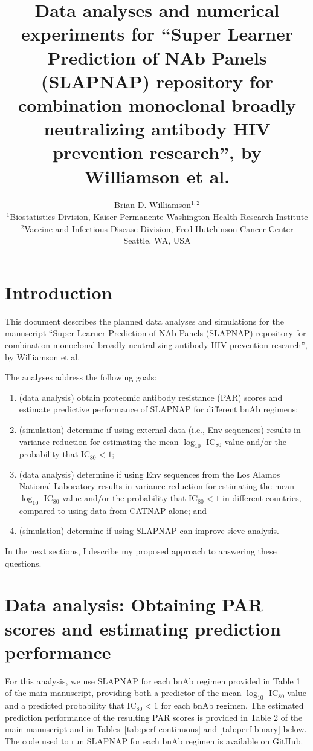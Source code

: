 \documentclass[10pt]{article}
\author{Brian D. Williamson$^{1,2}$ \\
${}^1$Biostatistics Division, Kaiser Permanente Washington Health Research Institute \\
${}^2$Vaccine and Infectious Disease Division, Fred Hutchinson Cancer Center \\
Seattle, WA, USA
}
\title{Data analyses and numerical experiments for ``Super Learner Prediction of NAb Panels (SLAPNAP) repository for combination monoclonal broadly neutralizing antibody HIV prevention research'', by Williamson et al.}
\date{}
\begin{document}
\maketitle

\section{Introduction}

This document describes the planned data analyses and simulations for the manuscript ``Super Learner Prediction of NAb Panels (SLAPNAP) repository for combination monoclonal broadly neutralizing antibody HIV prevention research'', by Williamson et al.

The analyses address the following goals:
\begin{enumerate}
    \item (data analysis) obtain proteomic antibody resistance (PAR) scores and estimate predictive performance of SLAPNAP for different bnAb regimens;
    \item (simulation) determine if using external data (i.e., Env sequences) results in variance reduction for estimating the mean $\log_{10}$ IC$_{80}$ value and/or the probability that IC$_{80} < 1$;
    \item (data analysis) determine if using Env sequences from the Los Alamos National Laboratory results in variance reduction for estimating the mean $\log_{10}$ IC$_{80}$ value and/or the probability that IC$_{80} < 1$ in different countries, compared to using data from CATNAP \citep{yoon2015} alone; and
    \item (simulation) determine if using SLAPNAP \citep{williamson2021} can improve sieve analysis.
\end{enumerate}
In the next sections, I describe my proposed approach to answering these questions.

\section{Data analysis: Obtaining PAR scores and estimating prediction performance}\label{sec:par_scores}

For this analysis, we use SLAPNAP \citep{williamson2021} for each bnAb regimen provided in Table 1 of the main manuscript, providing both a predictor of the mean $\log_{10}$ IC$_{80}$ value and a predicted probability that IC$_{80} < 1$ for each bnAb regimen. The estimated prediction performance of the resulting PAR scores is provided in Table 2 of the main manuscript and in Tables~\ref{tab:perf-continuous} and \ref{tab:perf-binary} below. The code used to run SLAPNAP for each bnAb regimen is available on GitHub.
\end{document}
